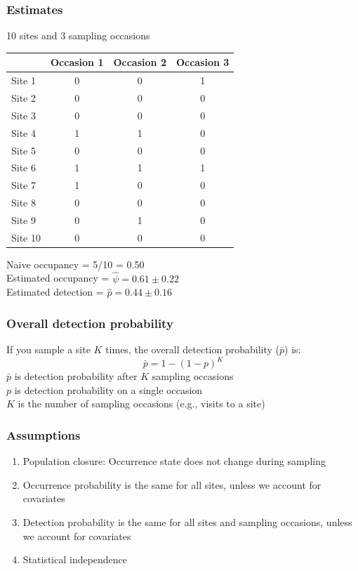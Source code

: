 \documentclass[color=usenames,dvipsnames]{beamer}\usepackage[]{graphicx}\usepackage[]{color}
\begin{document}
\begin{frame}
  \frametitle{Estimates}
  {%
    \centering \large 10 sites and 3 sampling occasions \par}
  \vspace{0.3cm}
  \begin{center}
    \small
    \begin{tabular}{lccc}
      \hline
      & Occasion 1 & Occasion 2 & Occasion 3 \\
      \hline
      Site 1 & 0 & 0 & 1 \\
      Site 2 & 0 & 0 & 0 \\
      Site 3 & 0 & 0 & 0 \\
      Site 4 & 1 & 1 & 0 \\
      Site 5 & 0 & 0 & 0 \\
      Site 6 & 1 & 1 & 1 \\
      Site 7 & 1 & 0 & 0 \\
      Site 8 & 0 & 0 & 0 \\
      Site 9 & 0 & 1 & 0 \\
      Site 10 & 0 & 0 & 0 \\
      \hline
    \end{tabular}
  \end{center}
  Naive occupancy = 5/10 = 0.50 \\
  Estimated occupancy = $\hat{\psi} = 0.61 \pm 0.22$ \\
  Estimated detection = $\hat{p} = 0.44 \pm 0.16$ \\
\end{frame}




\begin{frame}
  \frametitle{Overall detection probability}
  \large
  {\centering If you sample a site $K$ times, the overall detection
    probability ($\bar{p}$) is:}
  \[
    \bar{p} = 1 - (1-p)^K
  \]
  \vfill
  \large
  $\bar{p}$ is detection probability after $K$ sampling occasions \\
  $p$ is detection probability on a single occasion \\
  $K$ is the number of sampling occasions (e.g., visits to a site)
\end{frame}









\begin{frame}
  \frametitle{Assumptions}
  \large
  \begin{enumerate}[<+- | visible@+->][\bf \color{PineGreen} (1)]
    \item Population closure: Occurrence state does not change during sampling
    \item Occurrence probability is the same for all sites, unless we
      account for \alert{covariates}
    \item Detection probability is the same for all sites and sampling
      occasions, unless we account for covariates
    \item Statistical independence
  \end{enumerate}
\end{frame}
\end{document}

